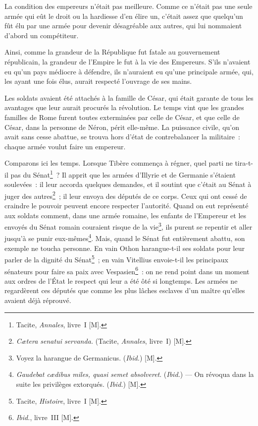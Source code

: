 \documentclass[french,twoside]{book} %
\begin{document}
La condition des empereurs n’était pas meilleure. Comme ce n’était pas une seule armée qui eût le droit ou la hardiesse d’en élire un, c’était assez que quelqu’un fût élu par une armée pour devenir désagréable aux autres, qui lui nommaient d’abord un compétiteur.\par
Ainsi, comme la grandeur de la République fut fatale au gouvernement républicain, la grandeur de l’Empire le fut à la vie des Empereurs. S’ils n’avaient eu qu’un pays médiocre à défendre, ils n’auraient eu qu’une principale armée, qui, les ayant une fois élus, aurait respecté l’ouvrage de ses mains.\par
Les soldats avaient été attachés à la famille de César, qui était garante de tous les avantages que leur aurait procurés la révolution. Le temps vint que les grandes familles de Rome furent toutes exterminées par celle de César, et que celle de César, dans la personne de Néron, périt elle-même. La puissance civile, qu’on avait sans cesse abattue, se trouva hors d’état de contrebalancer la militaire : chaque armée voulut faire un empereur.\par
Comparons ici les temps. Lorsque Tibère commença à régner, quel parti ne tira-t-il pas du Sénat\footnote{Tacite, {\itshape Annales}, livre I [M].} ? Il apprit que les armées d’Illyrie et de Germanie s’étaient soulevées : il leur accorda quelques demandes, et il soutint que c’était au Sénat à juger des autres\footnote{{\itshape Cætera senatui servanda.} (Tacite, {\itshape Annales}, livre I) [M].} ; il leur envoya des députés de ce corps. Ceux qui ont cessé de craindre le pouvoir peuvent encore respecter l’autorité. Quand on eut représenté aux soldats comment, dans une armée romaine, les enfants de l’Empereur et les envoyés du Sénat romain couraient risque de la vie\footnote{Voyez la harangue de Germanicus. ({\itshape Ibid.}) [M].}, ils purent se repentir et aller jusqu’à se punir eux-mêmes\footnote{{\itshape Gaudebat cædibus miles, quasi semet absolveret}. ({\itshape Ibid.}) — On révoqua dans la suite les privilèges extorqués. ({\itshape Ibid.}) [M].}. Mais, quand le Sénat fut entièrement abattu, son exemple ne toucha personne. En vain Othon harangue-t-il ses soldats pour leur parler de la dignité du Sénat\footnote{Tacite, {\itshape Histoire}, livre I [M].} ; en vain Vitellius envoie-t-il les principaux sénateurs pour faire sa paix avec Vespasien\footnote{{\itshape Ibid.}, livre III [M].} : on ne rend point dans un moment aux ordres de l’État le respect qui leur a été ôté si longtemps. Les armées ne regardèrent ces députés que comme les plus lâches esclaves d’un maître qu’elles avaient déjà réprouvé.\par
\end{document}
